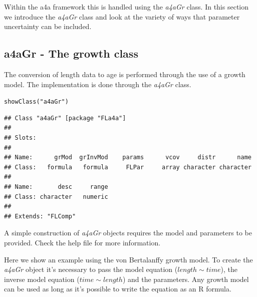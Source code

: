 \documentclass[a4paper,english,10pt]{article}\usepackage[]{graphicx}\usepackage[]{color}
\makeatletter
\newcommand{\hlstr}[1]{\textcolor[rgb]{0.2,0.2,0.2}{#1}}%
\newcommand{\hlstd}[1]{\textcolor[rgb]{0,0,0}{#1}}%
\newcommand{\hlkwd}[1]{\textcolor[rgb]{0.361,0.506,0.596}{#1}}%
\newenvironment{kframe}{%
 \def\at@end@of@kframe{}%
 \ifinner\ifhmode%
  \def\at@end@of@kframe{\end{minipage}}%
  \begin{minipage}{\columnwidth}%
 \fi\fi%
 \def\FrameCommand##1{\hskip\@totalleftmargin \hskip-\fboxsep
 \colorbox{shadecolor}{##1}\hskip-\fboxsep
     \hskip-\linewidth \hskip-\@totalleftmargin \hskip\columnwidth}%
 \MakeFramed {\advance\hsize-\width
   \@totalleftmargin\z@ \linewidth\hsize
   \@setminipage}}%
 {\par\unskip\endMakeFramed%
 \at@end@of@kframe}
\newenvironment{knitrout}{}{} %
\newcommand{\class}[1]{{\textit{#1}}}
\makeatother
\begin{document}
Within the a4a framework this is handled using the \class{a4aGr} class. In this section we introduce the \class{a4aGr} class and look at the variety of ways that parameter uncertainty can be included.

\subsection{a4aGr - The growth class}

The conversion of length data to age is performed through the use of a growth model. The implementation is done through the \class{a4aGr} class.

\begin{knitrout}
\color{fgcolor}\begin{kframe}
\begin{alltt}
\hlkwd{showClass}\hlstd{(}\hlstr{"a4aGr"}\hlstd{)}
\end{alltt}
\begin{verbatim}
## Class "a4aGr" [package "FLa4a"]
## 
## Slots:
##                                                                   
## Name:      grMod  grInvMod    params      vcov     distr      name
## Class:   formula   formula     FLPar     array character character
##                           
## Name:       desc     range
## Class: character   numeric
## 
## Extends: "FLComp"
\end{verbatim}
\end{kframe}
\end{knitrout}


A simple construction of \class{a4aGr} objects requires the model and parameters to be provided.
Check the help file for more information.

Here we show an example using the von Bertalanffy growth model. To create the \class{a4aGr} object it's necessary to pass the model equation ($length \sim time$), the inverse model equation ($time \sim length$) and the parameters. Any growth model can be used as long as it's possible to write the equation as an R formula.
\end{document}
